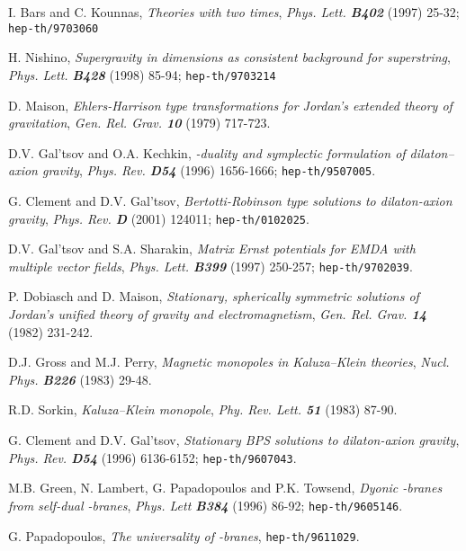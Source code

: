 \documentclass[a4paper,12pt]{article}
\begin{document}
\begin{thebibliography}{99}
    I. Bars and C. Kounnas,
    {\sl Theories with two times},
    {\it Phys. Lett. \bf B402} (1997) 25-32;
    {\tt hep-th/9703060}

    H. Nishino,
    {\sl Supergravity in \coordHE{} dimensions as consistent background for
         superstring},
    {\it Phys. Lett. \bf B428} (1998) 85-94;
    {\tt hep-th/9703214}

    D. Maison,
    {\sl Ehlers-Harrison type transformations for Jordan's extended
         theory of gravitation},
    {\it Gen. Rel. Grav. \bf 10} (1979) 717-723.

    D.V. Gal'tsov and O.A. Kechkin,
    {\sl {}\coordHE{}-duality and symplectic formulation of dilaton--axion gravity},
    {\it Phys. Rev. \bf D54} (1996) 1656-1666;
    {\tt hep-th/9507005}.

    G. Clement and D.V. Gal'tsov,
    {\sl Bertotti-Robinson type solutions to dilaton-axion gravity},
    {\it Phys. Rev. \bf D} (2001) 124011;
    {\tt hep-th/0102025}.

    D.V. Gal'tsov and S.A. Sharakin,
    {\sl Matrix Ernst potentials for EMDA with multiple vector fields},
    {\it Phys. Lett. \bf B399} (1997) 250-257;
    {\tt hep-th/9702039}.

    P. Dobiasch and D. Maison,
    {\sl Stationary, spherically symmetric solutions of Jordan's
         unified theory of gravity and electromagnetism},
    {\it Gen. Rel. Grav. \bf 14} (1982) 231-242.

    D.J. Gross and M.J. Perry,
    {\sl Magnetic monopoles in Kaluza--Klein theories},
    {\it Nucl. Phys. \bf B226} (1983) 29-48.

    R.D. Sorkin,
    {\sl Kaluza--Klein monopole},
    {\it Phy. Rev. Lett. \bf 51} (1983) 87-90.

    G. Clement and D.V. Gal'tsov,
    {\sl Stationary BPS solutions to dilaton-axion gravity},
    {\it Phys. Rev. \bf D54} (1996) 6136-6152;
    {\tt hep-th/9607043}.

    M.B. Green, N. Lambert, G. Papadopoulos and P.K. Towsend,
    {\sl Dyonic \coordHE{}-branes from self-dual \coordHE{}-branes},
    {\it Phys. Lett \bf B384} (1996) 86-92;
    {\tt hep-th/9605146}.

    G. Papadopoulos,
    {\sl The universality of \coordHE{}-branes},
    {\tt hep-th/9611029}.


\end{thebibliography}
\end{document}
